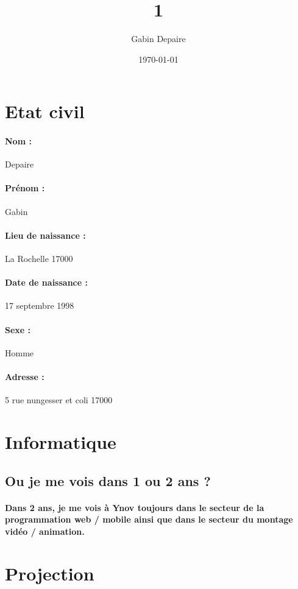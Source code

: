 \documentclass{article}
\title{1}
\author{Gabin Depaire}
\date\today
\begin{document}
\maketitle

\section{Etat civil}

\paragraph{Nom : }
Depaire
\paragraph{Prénom : }
Gabin
\paragraph{Lieu de naissance : }
La Rochelle 17000
\paragraph{Date de naissance : }
17 septembre 1998
\paragraph{Sexe : }
Homme
\paragraph{Adresse : }
5 rue nungesser et coli 17000


\section{Informatique}
\subsection{Ou je me vois dans 1 ou 2 ans ?}
\paragraph{Dans 2 ans, je me vois à Ynov toujours dans le secteur de la programmation web / mobile ainsi que dans le secteur du montage vidéo / animation.  }


\section{Projection}
\end{document}
